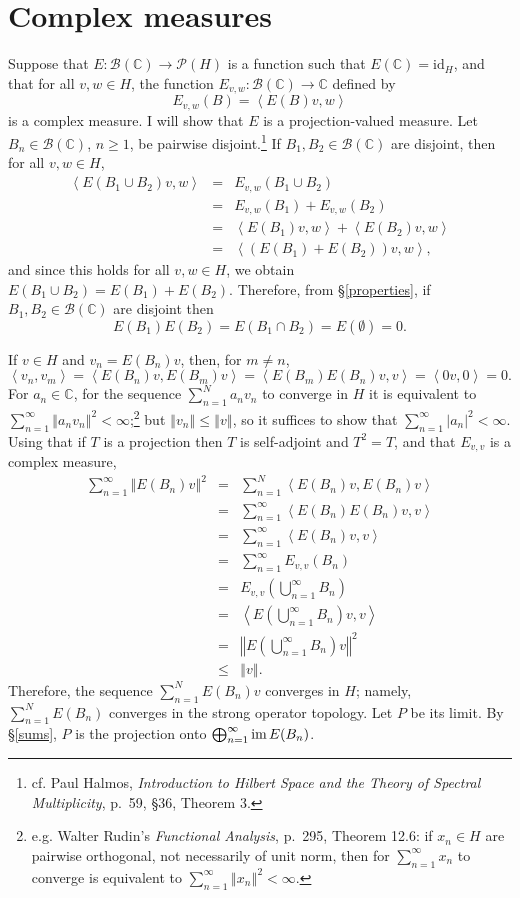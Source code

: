 \documentclass{article}
\newcommand{\inner}[2]{\left\langle #1, #2 \right\rangle}
\newcommand{\im}{\textrm{im\,}}
\newcommand{\id}{\textrm{id}}
\newcommand{\norm}[1]{\left\Vert #1 \right\Vert}
\begin{document}
\section{Complex measures}
Suppose that $E:\mathscr{B}(\mathbb{C}) \to \mathscr{P}(H)$ is a function such that
$E(\mathbb{C})=\id_H$, and that for all $v, w\in H$, the function
$E_{v,w}:\mathscr{B}(\mathbb{C}) \to \mathbb{C}$ defined by
\[
E_{v,w}(B)=\inner{E(B)v}{w}
\]
is a complex measure. I will show  that $E$ is a projection-valued measure. Let $B_n \in \mathscr{B}(\mathbb{C})$, $n \geq 1$, be pairwise disjoint.\footnote{cf. 
Paul Halmos, {\em Introduction to Hilbert Space and the Theory of Spectral Multiplicity}, p.~59, \S 36, Theorem 3.}
If $B_1,B_2 \in \mathscr{B}(\mathbb{C})$ are disjoint, then for all $v,w \in H$,
\begin{eqnarray*}
\inner{E(B_1 \cup B_2)v}{w}&=&E_{v,w}(B_1 \cup B_2)\\
&=&E_{v,w}(B_1)+E_{v,w}(B_2)\\
&=&\inner{E(B_1)v}{w}+\inner{E(B_2)v}{w}\\
&=&\inner{(E(B_1)+E(B_2))v}{w},
\end{eqnarray*}
and since this holds for all $v, w \in H$, we obtain $E(B_1 \cup B_2)=E(B_1)+E(B_2)$. Therefore, from \S \ref{properties},
if $B_1,B_2 \in \mathscr{B}(\mathbb{C})$ are disjoint then
\[
E(B_1)E(B_2)=E(B_1 \cap B_2)=E(\emptyset)=0.
\]

If $v \in H$ and  $v_n=E(B_n)v$, then, for $m \neq n$,
\[
\inner{v_n}{v_m}=\inner{E(B_n)v}{E(B_m)v}=\inner{E(B_m)E(B_n)v}{v}=\inner{0v}{0}=0.
\]
For $a_n \in \mathbb{C}$, for the sequence $\sum_{n=1}^N a_n v_n$ to converge
in $H$ it is equivalent to $\sum_{n=1}^\infty \norm{a_n v_n}^2 < \infty$;\footnote{e.g. Walter Rudin's
{\em Functional Analysis}, p.~295, Theorem 12.6: if $x_n \in H$ are pairwise orthogonal, not necessarily of unit norm,
then for $\sum_{n=1}^\infty x_n$ to converge is equivalent to $\sum_{n=1}^\infty \norm{x_n}^2<\infty$.} but
$\norm{v_n} \leq \norm{v}$, so it suffices to show that $\sum_{n=1}^\infty |a_n|^2<\infty$.
Using that if $T$ is a projection then $T$ is self-adjoint and $T^2=T$, and that $E_{v,v}$ is a complex measure,
\begin{eqnarray*}
\sum_{n=1}^\infty \norm{E(B_n)v}^2&=&\sum_{n=1}^N \inner{E(B_n)v}{E(B_n)v}\\
&=&\sum_{n=1}^\infty \inner{E(B_n)E(B_n)v}{v}\\
&=&\sum_{n=1}^\infty \inner{E(B_n)v}{v}\\
&=&\sum_{n=1}^\infty E_{v,v}(B_n)\\
&=&E_{v,v}\left(\bigcup_{n=1}^\infty B_n \right)\\
&=&\inner{E\left(\bigcup_{n=1}^\infty B_n\right)v}{v}\\
&=&\norm{E\left(\bigcup_{n=1}^\infty B_n\right)v}^2\\
&\leq&\norm{v}.
\end{eqnarray*}
Therefore,  the sequence $\sum_{n=1}^N E(B_n)v$ converges in $H$; namely, $\sum_{n=1}^N E(B_n)$ converges
in the strong operator topology. Let $P$ be its limit. 
By \S \ref{sums}, $P$ is the projection onto $\bigoplus_{n=1}^\infty \im E(B_n)$.
\end{document}

